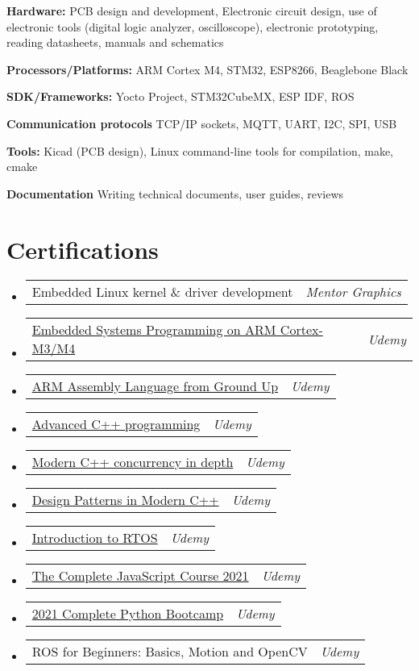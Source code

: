 \documentclass[a4paper,11pt]{article}
\makeatletter
\newcommand{\liststart}{\begin{itemize}[leftmargin=10pt]}
\newcommand{\listend}{\end{itemize}}
\newcommand{\listitemone}{\item}
\newcommand{\skill}[2] {
    \textbf{#1} #2 \\
    \vspace {3pt}
}
\newcommand{\cert}[2] {
    \listitemone
	\begin{tabular*}{7.1in}{l@{\extracolsep{\fill}}r}
	    {#1} & \textit{#2}
	\end{tabular*}\vspace{-6pt}
}
\makeatother
\begin{document}
\skill{Hardware:} {PCB design and development, Electronic circuit design,               use of electronic tools (digital logic analyzer, oscilloscope),
                   electronic prototyping, reading
                   datasheets, manuals and schematics}

\skill{Processors/Platforms:} {ARM Cortex M4, STM32, ESP8266, Beaglebone Black}

\skill{SDK/Frameworks:} {Yocto Project, STM32CubeMX, ESP IDF, ROS}

\skill{Communication protocols} {TCP/IP sockets, MQTT, UART, I2C, SPI, USB}

\skill{Tools:} {Kicad (PCB design), Linux command-line tools for 	  	 		            compilation, make, cmake}

\skill{Documentation} {Writing technical documents, user guides, reviews}


\vspace{0.005in}
\vspace{0.005in}
\section{Certifications}
\liststart
    \cert{Embedded Linux kernel \& driver development}{Mentor Graphics}
    \cert{\href{https://www.udemy.com/certificate/UC-014143dc-66f6-4203-addc-3c255e54ddbb/}{Embedded Systems Programming on ARM Cortex-M3/M4}}	  	          {Udemy}
    \cert{\href{https://www.udemy.com/certificate/UC-39a37dc0-8a26-4721-a7f4-61e2600e380e}{ARM Assembly Language from Ground Up}}	  	          {Udemy}
    \cert{\href{https://www.udemy.com/certificate/UC-VRNTEUJM/}{Advanced C++ programming}}{Udemy}
    \cert{\href{https://www.udemy.com/certificate/UC-0RLGR3RM/}{Modern C++ 		  concurrency in depth}}{Udemy}
    \cert{\href{https://www.udemy.com/certificate/UC-088f030e-b644-42e5-b2ee-a1cd61a53e96/}{Design Patterns in Modern C++}}{Udemy}
    \cert{\href{https://www.udemy.com/certificate/UC-A7SUDAR3/}				          {Introduction to RTOS}}{Udemy}
    \cert{\href{https://www.udemy.com/certificate/UC-b6b01a07-f2f0-4e2f-add1-37981acecf1f/}{The Complete JavaScript Course 2021}}{Udemy}
    \cert{\href{https://www.udemy.com/certificate/UC-11f326fc-276b-4cee-b3bf-1cb8c1529cc1/}{2021 Complete Python Bootcamp}}{Udemy}
    \cert{ROS for Beginners: Basics, Motion and OpenCV}{Udemy}
\listend


\vspace{0.005in}
\end{document}
